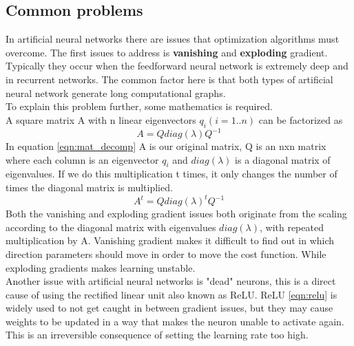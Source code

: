 \subsection{Common problems}
\label{vanishing-gradient}
\label{exploding-gradient}
In artificial neural networks there are issues that optimization algorithms must overcome. The first issues to address is \textbf{vanishing} and \textbf{exploding} gradient. Typically they occur when the feedforward neural network is extremely deep and in recurrent networks. The common factor here is that both types of artificial neural network generate long computational graphs. \\
To explain this problem further, some mathematics is required.\\
A square matrix A with n linear eigenvectors $q_i (i=1..n)$ can be factorized as
\begin{equation} \label{eqn:mat_decomp}
    A=Q diag(\lambda) Q^{-1} 
\end{equation}
In equation \ref{eqn:mat_decomp} A is our original matrix, Q is an nxn matrix where each column is an eigenvector $q_i$ and $diag(\lambda)$ is a diagonal matrix of eigenvalues. If we do this multiplication t times, it only changes the number of times the diagonal matrix is multiplied. \cite{weisstein_eigen_????}
\begin{equation} \label{eqn:mat_decomp_t}
    A^{t} = Q diag(\lambda)^{t} Q^{-1}
\end{equation}
Both the vanishing and exploding gradient issues both originate from the scaling according to the diagonal matrix with eigenvalues $diag(\lambda)$, with repeated multiplication by A. Vanishing gradient makes it difficult to find out in which direction parameters should move in order to move the cost function. While exploding gradients makes learning unstable. \cite{goodfellow_deep_2016} \\

Another issue with artificial neural networks is "dead" neurons, this is a direct cause of using the rectified linear unit also known as ReLU. ReLU \ref{eqn:relu} is widely used to not get caught in between gradient issues, but they may cause weights to be updated in a way that makes the neuron unable to activate again. This is an irreversible consequence of setting the learning rate too high.\cite{_cs231n_????}

